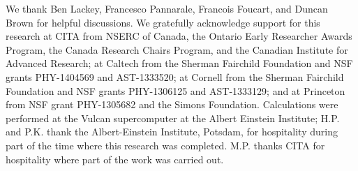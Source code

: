 \documentclass[aps,prd,amsmath,floats,floatfix, twocolumn,
superscriptaddress,nofootinbib,showpacs]{revtex4-1}
\begin{document}
\begin{acknowledgments}
We thank Ben Lackey, Francesco Pannarale, Francois Foucart, and Duncan Brown
    for helpful discussions. We gratefully acknowledge support
  for this research at CITA from NSERC of Canada, the Ontario Early 
  Researcher Awards Program, the Canada Research
  Chairs Program, and the Canadian Institute for Advanced Research; at
  Caltech from the Sherman Fairchild Foundation and NSF grants
  PHY-1404569 and AST-1333520; at Cornell from the
  Sherman Fairchild Foundation and NSF grants PHY-1306125 and
  AST-1333129; and at Princeton from NSF grant PHY-1305682 and the
  Simons Foundation.  Calculations were performed at the Vulcan
  supercomputer at the Albert Einstein Institute;
  H.P. and P.K. thank the Albert-Einstein Institute,
  Potsdam, for hospitality during part of the time where this research
  was completed. M.P. thanks CITA for hospitality where part of the work
  was carried out.
\end{acknowledgments}
\end{document}
